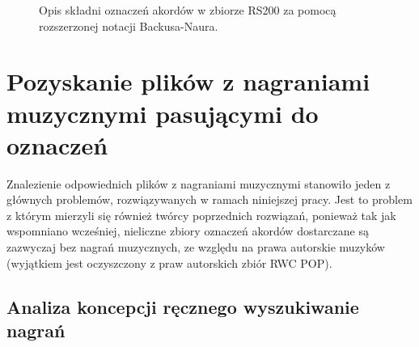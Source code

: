\begin{figure}
    \centering
    {\scriptsize }
    \caption{Opis składni oznaczeń akordów w zbiorze RS200 za pomocą rozszerzonej notacji Backusa-Naura.}
    \label{fig:rs200_dt_syntax}
\end{figure}


\section{Pozyskanie plików z nagraniami muzycznymi pasującymi do oznaczeń}

Znalezienie odpowiednich plików z nagraniami muzycznymi stanowiło jeden z głównych problemów, rozwiązywanych w ramach niniejszej pracy. Jest to problem z którym mierzyli się również twórcy poprzednich rozwiązań, ponieważ tak jak wspomniano wcześniej, nieliczne zbiory oznaczeń akordów dostarczane są zazwyczaj bez nagrań muzycznych, ze względu na prawa autorskie muzyków (wyjątkiem jest oczyszczony z praw autorskich zbiór RWC POP).

\subsection{Analiza koncepcji ręcznego wyszukiwanie nagrań}

